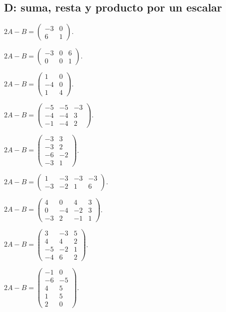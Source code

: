 \documentclass[12pt]{article}
\theoremstyle{remark}
\begin{document}
\subsection*{D: suma, resta y producto por un escalar}
\begin{description}[style=nextline,leftmargin=3em,itemsep=0.45em]
\item[E71.] $2A-B=\begin{pmatrix}-3&0\\6&1\end{pmatrix}$.
\item[E72.] $2A-B=\begin{pmatrix}-3&0&6\\0&0&1\end{pmatrix}$.
\item[E73.] $2A-B=\begin{pmatrix}1&0\\-4&0\\1&4\end{pmatrix}$.
\item[E74.] $2A-B=\begin{pmatrix}-5&-5&-3\\-4&-4&3\\-1&-4&2\end{pmatrix}$.
\item[E75.] $2A-B=\begin{pmatrix}-3&3\\-3&2\\-6&-2\\-3&1\end{pmatrix}$.
\item[E76.] $2A-B=\begin{pmatrix}1&-3&-3&-3\\-3&-2&1&6\end{pmatrix}$.
\item[E77.] $2A-B=\begin{pmatrix}4&0&4&3\\0&-4&-2&3\\-3&2&-1&1\end{pmatrix}$.
\item[E78.] $2A-B=\begin{pmatrix}3&-3&5\\4&4&2\\-5&-2&1\\-4&6&2\end{pmatrix}$.
\item[E79.] $2A-B=\begin{pmatrix}-1&0\\-6&-5\\4&5\\1&5\\2&0\end{pmatrix}$.

\end{description}
\end{document}
